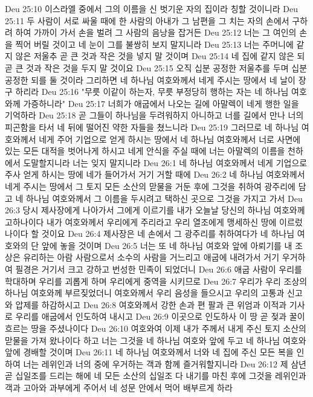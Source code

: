 Deu 25:10  이스라엘 중에서 그의 이름을 신 벗기운 자의 집이라 칭할 것이니라
Deu 25:11  두 사람이 서로 싸울 때에 한 사람의 아내가 그 남편을 그 치는 자의 손에서 구하려 하여 가까이 가서 손을 벌려 그 사람의 음낭을 잡거든
Deu 25:12  너는 그 여인의 손을 찍어 버릴 것이고 네 눈이 그를 불쌍히 보지 말지니라
Deu 25:13  너는 주머니에 같지 않은 저울추 곧 큰 것과 작은 것을 넣지 말 것이며
Deu 25:14  네 집에 같지 않은 되 곧 큰 것과 작은 것을 두지 말 것이요
Deu 25:15  오직 십분 공정한 저울추를 두며 십분 공정한 되를 둘 것이라 그리하면 네 하나님 여호와께서 네게 주시는 땅에서 네 날이 장구 하리라
Deu 25:16  "무릇 이같이 하는자, 무릇 부정당히 행하는 자는 네 하나님 여호와께 가증하니라"
Deu 25:17  너희가 애굽에서 나오는 길에 아말렉이 네게 행한 일을 기억하라
Deu 25:18  곧 그들이 하나님을 두려워하지 아니하고 너를 길에서 만나 너의 피곤함을 타서 네 뒤에 떨어진 약한 자들을 쳤느니라
Deu 25:19  그러므로 네 하나님 여호와께서 네게 주어 기업으로 얻게 하시는 땅에서 네 하나님 여호와께서 너로 사면에 있는 모든 대적을 벗어나게 하시고 네게 안식을 주실 때에 너는 아말렉의 이름을 천하에서 도말할지니라 너는 잊지 말지니라
Deu 26:1  네 하나님 여호와께서 네게 기업으로 주사 얻게 하시는 땅에 네가 들어가서 거기 거할 때에
Deu 26:2  네 하나님 여호와께서 네게 주시는 땅에서 그 토지 모든 소산의 맏물을 거둔 후에 그것을 취하여 광주리에 담고 네 하나님 여호와께서 그 이름을 두시려고 택하신 곳으로 그것을 가지고 가서
Deu 26:3  당시 제사장에게 나아가서 그에게 이르기를 내가 오늘날 당신의 하나님 여호와께 고하나이다 내가 여호와께서 우리에게 주리라고 우리 열조에게 맹세하신 땅에 이르렀나이다 할 것이요
Deu 26:4  제사장은 네 손에서 그 광주리를 취하여다가 네 하나님 여호와의 단 앞에 놓을 것이며
Deu 26:5  너는 또 네 하나님 여호와 앞에 아뢰기를 내 조상은 유리하는 아람 사람으로서 소수의 사람을 거느리고 애굽에 내려가서 거기 우거하여 필경은 거기서 크고 강하고 번성한 민족이 되었더니
Deu 26:6  애굽 사람이 우리를 학대하며 우리를 괴롭게 하며 우리에게 중역을 시키므로
Deu 26:7  우리가 우리 조상의 하나님 여호와께 부르짖었더니 여호와께서 우리 음성을 들으시고 우리의 고통과 신고와 압제를 하감하시고
Deu 26:8  여호와께서 강한 손과 편 팔과 큰 위엄과 이적과 기사로 우리를 애굽에서 인도하여 내시고
Deu 26:9  이곳으로 인도하사 이 땅 곧 젖과 꿀이 흐르는 땅을 주셨나이다
Deu 26:10  여호와여 이제 내가 주께서 내게 주신 토지 소산의 맏물을 가져 왔나이다 하고 너는 그것을 네 하나님 여호와 앞에 두고 네 하나님 여호와 앞에 경배할 것이며
Deu 26:11  네 하나님 여호와께서 너와 네 집에 주신 모든 복을 인하여 너는 레위인과 너의 중에 우거하는 객과 함께 즐거워할지니라
Deu 26:12  제 삼년 곧 십일조를 드리는 해에 네 모든 소산의 십일조 다 내기를 마친 후에 그것을 레위인과 객과 고아와 과부에게 주어서 네 성문 안에서 먹어 배부르게 하라
